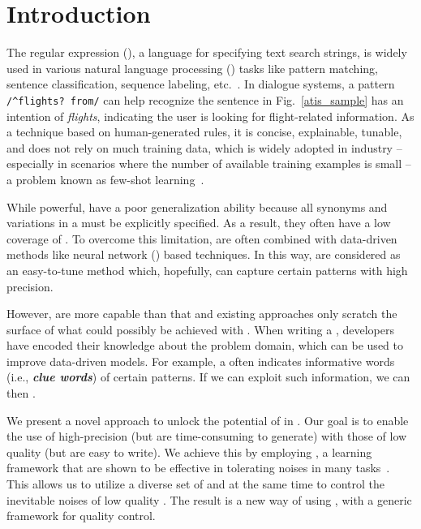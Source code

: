 \section{Introduction}


The regular expression (\RE), a language for specifying text search strings, is widely used in various natural language processing (\NLP)
tasks like pattern matching, sentence classification, sequence labeling, etc.~\cite{chang2014tokensregex}. In dialogue systems, a \RE
pattern \texttt{/\textasciicircum flights? from/} can help recognize the sentence in Fig.~\ref{atis_sample} has an intention of
\emph{flights}, indicating the user is looking for flight-related information. As a technique based on human-generated rules, it is
concise, explainable, tunable, and does not rely on much training data, which is widely adopted in industry -- especially in scenarios
where the number of available training examples is small -- a problem known as few-shot learning~\cite{gc2015big}.

While powerful, \REs have a poor generalization ability because all synonyms and variations in a \RE must be explicitly specified. As a
result, they often have a low coverage of . To overcome this limitation, \REs are often combined with data-driven methods like neural
network (\NN) based techniques. In this way, \REs are considered as an easy-to-tune method which, hopefully, can capture certain patterns
with high precision.

However, \REs are more capable than that and existing approaches only scratch the surface of what could possibly be achieved with \REs.
When writing a \RE, developers have encoded their knowledge about the problem domain, which can be used to improve data-driven models. For
example, a \RE often indicates informative words (i.e., \textbf{\textit{clue words}}) of certain patterns. If we can exploit such
information, we can then .

We present a novel approach to unlock the potential of \REs in \NLP. Our goal is to enable the use of high-precision \REs (but are
time-consuming to generate) with those of low quality (but are easy to write). We achieve this by employing \NNs, a learning framework that
are shown to be effective in tolerating noises in many \NLP tasks~\cite{xie2016disturblabel,goldberg2017neural}. This allows us to utilize
a diverse set of \REs and at the same time to control the inevitable noises of
 low quality \REs. The result is a new way of using \REs, with a generic framework for quality control.

